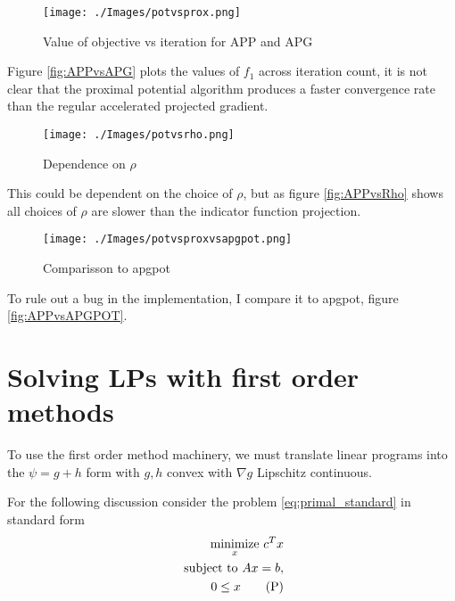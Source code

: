 \documentclass[smallextended]{article}       %
\begin{document}
 \begin{figure}[h]
   \begin{center}
     \texttt{[image: ./Images/potvsprox.png]}
   \end{center}
   \caption{Value of objective vs iteration for APP and APG}
   \label{fig:APPvsAPG}
 \end{figure}
 Figure \eqref{fig:APPvsAPG} plots the values of $f_1$ across iteration count, it is 
 not clear that the proximal potential algorithm produces a faster convergence rate
 than the regular accelerated projected gradient.

 \begin{figure}[h]
   \begin{center}
     \texttt{[image: ./Images/potvsrho.png]}
   \end{center}
   \caption{Dependence on $\rho$}
   \label{fig:APPvsRho}
 \end{figure}

 This could be dependent on the choice of $\rho$, but as figure \eqref{fig:APPvsRho} shows 
 all choices of $\rho$ are slower than the indicator function projection.

\begin{figure}[h]
   \begin{center}
     \texttt{[image: ./Images/potvsproxvsapgpot.png]}
   \end{center}
   \caption{Comparisson to apgpot}
   \label{fig:APPvsAPGPOT}
 \end{figure}

To rule out a bug in the implementation, I compare it to apgpot, figure \eqref{fig:APPvsAPGPOT}.

\section{Solving LPs with first order methods}
To use the first order method machinery, we must translate linear programs into
the $\psi = g+h$ form with $g,h$ convex with $\nabla g$ Lipschitz continuous.

For the following discussion consider the problem \eqref{eq:primal_standard} in standard form
\begin{align}
  \underset{x}{\operatorname{minimize}}\ {c^Tx}\\
  \text{ subject to } Ax=b,\\
    0\leq x
    \tag{P}
  \label{eq:primal_standard}
\end{align}
\end{document}
